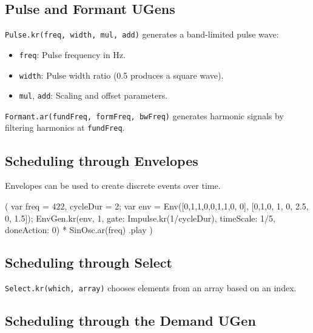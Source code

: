 \subsection{Pulse and Formant UGens}

\texttt{Pulse.kr(freq, width, mul, add)} generates a band-limited pulse wave:

\begin{itemize}
    \item \texttt{freq}: Pulse frequency in Hz.
    \item \texttt{width}: Pulse width ratio (0.5 produces a square wave).
    \item \texttt{mul}, \texttt{add}: Scaling and offset parameters.
\end{itemize}

\texttt{Formant.ar(fundFreq, formFreq, bwFreq)} generates harmonic signals by filtering harmonics at \texttt{fundFreq}.

\subsection{Scheduling through Envelopes}

Envelopes can be used to create discrete events over time.

\begin{supercollider*}
(
{
    var freq = 422, cycleDur = 2;
    var env = Env([0,1,1,0,0,1,1,0, 0], [0,1,0, 1, 0, 2.5, 0, 1.5]);
    EnvGen.kr(env, 1, gate: Impulse.kr(1/cycleDur), timeScale: 1/5, doneAction: 0) 
    * SinOsc.ar(freq)
}.play
)
\end{supercollider*}

\subsection{Scheduling through Select}

\texttt{Select.kr(which, array)} chooses elements from an array based on an index.


\subsection{Scheduling through the Demand UGen}

